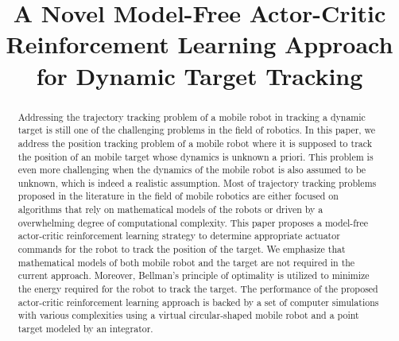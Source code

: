 \documentclass[conference]{IEEEtran}
\begin{document}
\title{A Novel Model-Free Actor-Critic  Reinforcement Learning Approach for Dynamic Target Tracking  
%  
}

\author{%
%
}

\maketitle

\begin{abstract}
  Addressing the trajectory tracking problem of a mobile robot in tracking a dynamic target is still one of the challenging problems in the field of robotics. In this paper, we address the position tracking problem of a mobile robot where it is supposed to track the position of an mobile target whose dynamics is unknown a priori. This problem is even more challenging when the dynamics of the mobile robot is also assumed to be unknown, which is indeed a realistic assumption. Most of trajectory tracking problems proposed in the literature in the field of mobile robotics are either focused on algorithms that rely on mathematical models of the robots or driven by a  overwhelming degree of computational complexity. This paper proposes a model-free actor-critic reinforcement learning strategy to determine appropriate actuator commands for the robot to track the position of the target. We emphasize that mathematical models of both mobile robot and the target are not required in the current approach. Moreover, Bellman's principle of optimality is utilized to minimize the energy required for the robot to track the target. The performance of the proposed actor-critic reinforcement learning approach  is backed by a set of computer simulations with various complexities using a virtual circular-shaped mobile robot and a point target  modeled by an integrator. 
%
\end{abstract}
\end{document}
